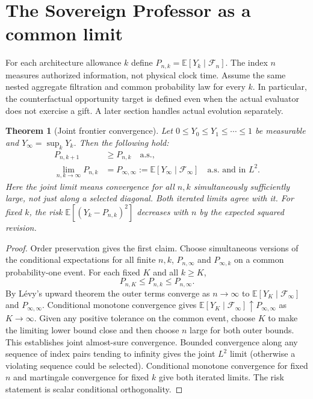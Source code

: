 \documentclass[11pt]{article}
\newtheorem{theorem}{Theorem}[section]\newtheorem{proposition}[theorem]{Proposition}\newtheorem{corollary}[theorem]{Corollary}\newtheorem{definition}[theorem]{Definition}\newtheorem{example}[theorem]{Example}\newtheorem{conjecture}[theorem]{Conjecture}
\newcommand{\E}{\mathbb E}\newcommand{\Prob}{\mathbb P}\newcommand{\F}{\mathcal F}\newcommand{\N}{\mathbb N}\newcommand{\Var}{\operatorname{Var}}\newcommand{\one}{\mathbf 1}\newcommand{\spp}{\mathrm{SPP}}
\begin{document}
\section{The Sovereign Professor as a common limit}
For each architecture allowance $k$ define $P_{n,k}=\E[Y_k\mid\F_n]$. The index $n$ measures authorized information, not physical clock time. Assume the same nested aggregate filtration and common probability law for every $k$. In particular, the counterfactual opportunity target is defined even when the actual evaluator does not exercise a gift. A later section handles actual evolution separately.
\begin{theorem}[Joint frontier convergence]\label{thm:joint}
Let $0\leq Y_0\leq Y_1\leq\cdots\leq1$ be measurable and $Y_\infty=\sup_kY_k$. Then the following hold:
\begin{align}
P_{n,k+1}&\geq P_{n,k}\quad\text{a.s.},\\
\lim_{n,k\to\infty}P_{n,k}&=P_{\infty,\infty}:=\E[Y_\infty\mid\F_\infty]\quad\text{a.s. and in }L^2.\label{eq:joint}
\end{align}
Here the joint limit means convergence for all $n,k$ simultaneously sufficiently large, not just along a selected diagonal. Both iterated limits agree with it. For fixed $k$, the risk $\E[(Y_k-P_{n,k})^2]$ decreases with $n$ by the expected squared revision.
\end{theorem}
\begin{proof}Order preservation gives the first claim. Choose simultaneous versions of the conditional expectations for all finite $n,k$, $P_{n,\infty}$ and $P_{\infty,k}$ on a common probability-one event. For each fixed $K$ and all $k\geq K$,
\[P_{n,K}\leq P_{n,k}\leq P_{n,\infty}.\]
By L\'evy's upward theorem the outer terms converge as $n\to\infty$ to $\E[Y_K\mid\F_\infty]$ and $P_{\infty,\infty}$. Conditional monotone convergence gives $\E[Y_K\mid\F_\infty]\uparrow P_{\infty,\infty}$ as $K\to\infty$. Given any positive tolerance on the common event, choose $K$ to make the limiting lower bound close and then choose $n$ large for both outer bounds. This establishes joint almost-sure convergence. Bounded convergence along any sequence of index pairs tending to infinity gives the joint $L^2$ limit (otherwise a violating sequence could be selected). Conditional monotone convergence for fixed $n$ and martingale convergence for fixed $k$ give both iterated limits. The risk statement is scalar conditional orthogonality.\end{proof}
\end{document}
